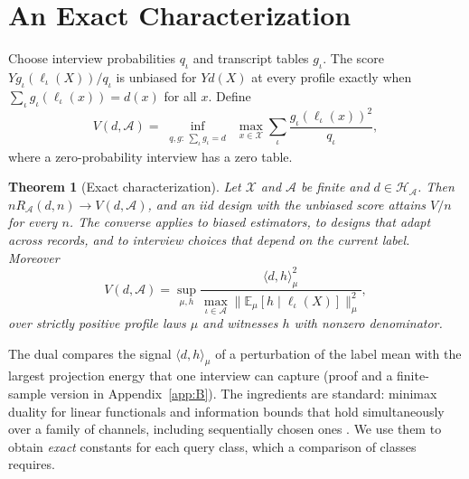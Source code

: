 \documentclass{article}
\newtheorem{theorem}{Theorem}
\newcommand{\E}{\mathbb{E}}
\newcommand{\X}{\mathcal X}
\newcommand{\A}{\mathcal A}
\newcommand{\Hh}{\mathcal H}
\begin{document}
\section{An Exact Characterization}\label{sec:general}
Choose interview probabilities $q_\iota$ and transcript tables $g_\iota$. The score $Yg_\iota(\ell_\iota(X))/q_\iota$ is unbiased for $Yd(X)$ at every profile exactly when $\sum_\iota g_\iota(\ell_\iota(x))=d(x)$ for all $x$. Define
\begin{equation}
 V(d,\A)=\inf_{\substack{q,g:\ \sum_\iota g_\iota=d}}\ \max_{x\in\X}
             \sum_\iota\frac{g_\iota(\ell_\iota(x))^2}{q_\iota},\label{eq:unbiasedprogram}
\end{equation}
where a zero-probability interview has a zero table.

\begin{theorem}[Exact characterization]\label{thm:char}
Let $\X$ and $\A$ be finite and $d\in\Hh_\A$. Then $nR_\A(d,n)\to V(d,\A)$, and an iid design with the unbiased score attains $V/n$ for every $n$. The converse applies to biased estimators, to designs that adapt across records, and to interview choices that depend on the current label. Moreover
\[
 V(d,\A)=\sup_{\mu,h}\frac{\langle d,h\rangle_\mu^2}{\max_{\iota\in\A}\|\E_\mu[h\mid\ell_\iota(X)]\|_\mu^2},
\]
over strictly positive profile laws $\mu$ and witnesses $h$ with nonzero denominator.
\end{theorem}
The dual compares the signal $\langle d,h\rangle_\mu$ of a perturbation of the label mean with the largest projection energy that one interview can capture (proof and a finite-sample version in Appendix~\ref{app:B}). The ingredients are standard: minimax duality for linear functionals \citep{donoho1994,juditsky2009,polyanskiy2026} and information bounds that hold simultaneously over a family of channels, including sequentially chosen ones \citep{acharya2019,barnes2020}. We use them to obtain \emph{exact} constants for each query class, which a comparison of classes requires.
\end{document}
